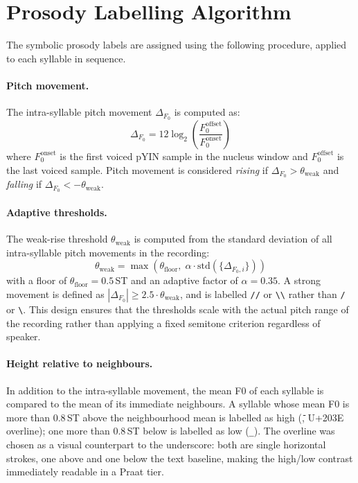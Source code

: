 \section{Prosody Labelling Algorithm}
\label{sec:prosody_label_method}

The symbolic prosody labels are assigned using the following procedure, applied
to each syllable in sequence.

\paragraph{Pitch movement.}
The intra-syllable pitch movement $\Delta_{F_0}$ is computed as:
\begin{equation}
  \Delta_{F_0} = 12 \log_2\!\left(\frac{F_0^{\mathrm{offset}}}{F_0^{\mathrm{onset}}}\right)
\end{equation}
where $F_0^{\mathrm{onset}}$ is the first voiced pYIN sample in the nucleus
window and $F_0^{\mathrm{offset}}$ is the last voiced sample. Pitch movement is
considered \emph{rising} if $\Delta_{F_0} > \theta_{\mathrm{weak}}$ and
\emph{falling} if $\Delta_{F_0} < -\theta_{\mathrm{weak}}$.

\paragraph{Adaptive thresholds.}
The weak-rise threshold $\theta_{\mathrm{weak}}$ is computed from the standard
deviation of all intra-syllable pitch movements in the recording:
\begin{equation}
  \theta_{\mathrm{weak}} = \max\!\left(\theta_{\mathrm{floor}},\;
    \alpha \cdot \mathrm{std}(\{\Delta_{F_0,i}\})\right)
\end{equation}
with a floor of $\theta_{\mathrm{floor}} = 0.5$\,ST and an adaptive factor of
$\alpha = 0.35$. A strong movement is defined as
$|\Delta_{F_0}| \geq 2.5 \cdot \theta_{\mathrm{weak}}$, and is labelled
\texttt{//} or \texttt{\textbackslash\textbackslash} rather than \texttt{/} or
\texttt{\textbackslash}. This design ensures that the thresholds scale with the
actual pitch range of the recording rather than applying a fixed semitone
criterion regardless of speaker.

\paragraph{Height relative to neighbours.}
In addition to the intra-syllable movement, the mean F0 of each syllable is
compared to the mean of its immediate neighbours. A syllable whose mean F0 is
more than 0.8\,ST above the neighbourhood mean is labelled as high
(\texttt{{\={}}}, U+203E overline); one more than 0.8\,ST below is labelled as
low (\texttt{\_}). The overline was chosen as a visual counterpart to the
underscore: both are single horizontal strokes, one above and one below the
text baseline, making the high/low contrast immediately readable in a Praat tier.

